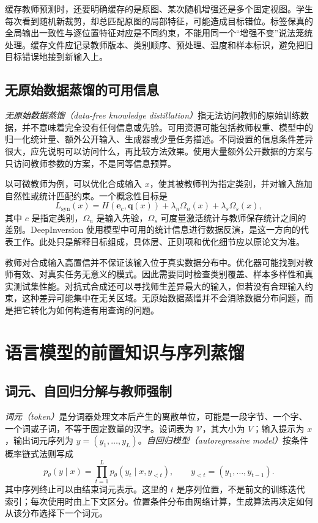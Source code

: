 \documentclass[UTF8,12pt,a4paper,fontset=fandol]{ctexart}
\begin{document}
缓存教师预测时，还要明确缓存的是原图、某次随机增强还是多个固定视图。学生每次看到随机新裁剪，却总匹配原图的局部特征，可能造成目标错位。标签保真的全局输出一致性与逐位置特征对应是不同约束，不能用同一个“增强不变”说法笼统处理。缓存文件应记录教师版本、类别顺序、预处理、温度和样本标识，避免把旧目标错误地接到新输入上。

\subsection{无原始数据蒸馏的可用信息}
\emph{无原始数据蒸馏（data-free knowledge distillation）}指无法访问教师的原始训练数据，并不意味着完全没有任何信息或先验。可用资源可能包括教师权重、模型中的归一化统计量、额外公开输入、生成器或少量任务描述。不同设置的信息条件差异很大，应先说明可以访问什么，再比较方法效果。使用大量额外公开数据的方案与只访问教师参数的方案，不是同等信息预算。

以可微教师为例，可以优化合成输入 $x$，使其被教师判为指定类别，并对输入施加自然性或统计匹配约束。一个概念性目标是
\[
 L_{\mathrm{syn}}(x)=H(\mathbf e_c,\mathbf q(x))
 +\lambda_{n}\Omega_{n}(x)+\lambda_{s}\Omega_{s}(x),
\]
其中 $c$ 是指定类别，$\Omega_{n}$ 是输入先验，$\Omega_{s}$ 可度量激活统计与教师保存统计之间的差别。DeepInversion 使用模型中可用的统计信息进行数据反演，是这一方向的代表工作\cite{yin2020}。此处只是解释目标组成，具体层、正则项和优化细节应以原论文为准。

教师对合成输入高置信并不保证该输入位于真实数据分布中。优化器可能找到对教师有效、对真实任务无意义的模式。因此需要同时检查类别覆盖、样本多样性和真实测试集性能。对抗式合成还可以寻找师生差异最大的输入，但若没有合理输入约束，这种差异可能集中在无关区域。无原始数据蒸馏并不会消除数据分布问题，而是把它转化为如何构造有用查询的问题。

\section{语言模型的前置知识与序列蒸馏}
\label{sec:kd-language}

\subsection{词元、自回归分解与教师强制}
\emph{词元（token）}是分词器处理文本后产生的离散单位，可能是一段字节、一个字、一个词或子词，不等于固定数量的汉字。设词表为 $\mathcal V$，其大小为 $V$；输入提示为 $x$，输出词元序列为 $y=(y_1,\ldots,y_L)$。\emph{自回归模型（autoregressive model）}按条件概率链式法则写成
\begin{equation}
 p_\theta(y\mid x)=\prod_{t=1}^L p_\theta(y_t\mid x,y_{<t}),
 \qquad y_{<t}=(y_1,\ldots,y_{t-1}).
 \label{eq:kd-autoregressive}
\end{equation}
其中序列终止可以由结束词元表示。这里的 $t$ 是序列位置，不是前文的训练迭代索引；每次使用时由上下文区分。位置条件分布由网络计算，生成算法再决定如何从该分布选择下一个词元。
\end{document}
